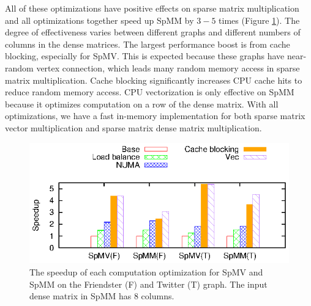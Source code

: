 All of these optimizations have positive effects on sparse matrix
multiplication and all optimizations together speed up SpMM by $3-5$ times
(Figure \ref{perf:spmm_opt}). The degree of effectiveness
varies between different graphs and different numbers of columns in
the dense matrices. The largest performance boost is from cache blocking,
especially for SpMV. This is expected because these graphs have near-random
vertex connection, which leads many random memory access in sparse matrix
multiplication. Cache blocking significantly increases CPU cache hits to reduce
random memory access. CPU vectorization is only effective on SpMM because
it optimizes computation on a row of the dense matrix.
With all optimizations, we have a fast in-memory implementation for both
sparse matrix vector multiplication and sparse matrix dense matrix multiplication.

\begin{figure}
	\begin{center}
		\footnotesize
		\includegraphics[scale=1]{SpMM_figs/SpMM_optimize.eps}
		\caption{The speedup of each computation optimization for SpMV and SpMM
			on the Friendster (F) and Twitter (T) graph. The input dense matrix
		in SpMM has 8 columns.}
		\label{perf:spmm_opt}
	\end{center}
\end{figure}

